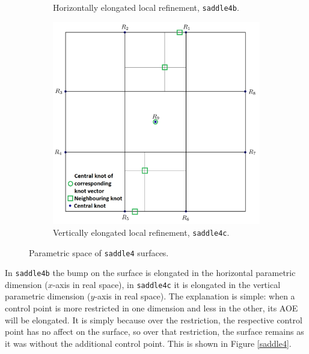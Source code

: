 \documentclass{article}
\begin{document}
\begin{figure}[H]
\begin{subfigure}[b]{0.32\textwidth}
\caption{Horizontally elongated local refinement, \texttt{saddle4b}.}
\label{saddle4bp}
\end{subfigure}
\begin{subfigure}[b]{0.32\textwidth}
\includegraphics[width=\textwidth]{saddle4cparam}
\caption{Vertically elongated local refinement, \texttt{saddle4c}.}
\label{saddle4cp}
\end{subfigure}
\caption{Parametric space of \texttt{saddle4} surfaces.}
\label{saddle4p}
\end{figure}

In \texttt{saddle4b} the bump on the surface is elongated in the horizontal parametric dimension ($x$-axis in real space), in \texttt{saddle4c} it is elongated in the vertical parametric dimension ($y$-axis in real space). The explanation is simple: when a control point is more restricted in one dimension and less in the other, its AOE will be elongated. It is simply because over the restriction, the respective control point has no affect on the surface, so over that restriction, the surface remains as it was without the additional control point. This is shown in Figure \ref{saddle4}.
\end{document}
